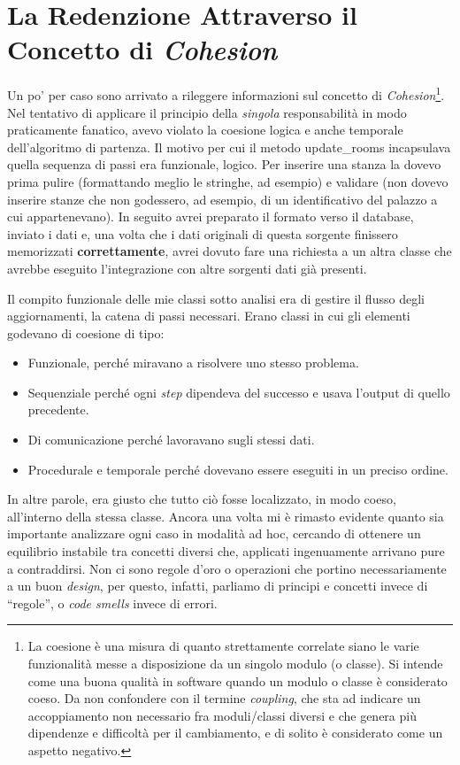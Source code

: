 \documentclass[12pt]{report}
\begin{document}
\section{La Redenzione Attraverso il Concetto di \textit{Cohesion}}
Un po' per caso sono arrivato a rileggere informazioni
sul concetto di \textit{Cohesion}\footnote{
La coesione è una misura di 
quanto strettamente correlate siano le varie funzionalità messe a disposizione 
da un singolo modulo (o classe). Si intende come una buona qualità in 
software quando un modulo o classe è considerato coeso. Da non confondere
con il termine \textit{coupling}, che sta ad indicare un accoppiamento non 
necessario fra moduli/classi diversi e che genera più dipendenze e difficoltà
per il cambiamento, e di solito è considerato come un aspetto negativo.
}.
Nel tentativo di applicare il principio della \textit{singola} responsabilità
in modo praticamente fanatico, avevo violato la coesione logica e anche
temporale dell'algoritmo di partenza. Il motivo per cui il metodo update\_rooms
incapsulava quella sequenza di passi era funzionale, logico. Per inserire 
una stanza la dovevo prima pulire (formattando meglio le stringhe, ad esempio)
e validare (non dovevo inserire stanze che non godessero, ad esempio, di un
identificativo del palazzo a cui appartenevano). In seguito avrei preparato il
formato verso il database, inviato i dati e, una volta che i dati originali
di questa sorgente finissero memorizzati \textbf{correttamente}, avrei dovuto 
fare una richiesta a un altra classe che avrebbe eseguito 
l'integrazione con altre sorgenti dati già presenti. 

Il compito funzionale delle mie classi sotto analisi era di gestire il 
flusso degli aggiornamenti, la catena di passi necessari.
Erano classi in cui gli elementi godevano di coesione di tipo:

\begin{itemize}
  \item Funzionale, perché miravano a risolvere uno stesso problema.
  \item Sequenziale perché ogni \textit{step} dipendeva del successo e usava 
  l'output di quello precedente.
  \item Di comunicazione perché lavoravano sugli stessi dati.
  \item Procedurale e temporale perché dovevano essere eseguiti in un preciso
ordine.
\end{itemize}

In altre parole, era giusto che tutto ciò fosse localizzato, in modo coeso, 
all'interno della stessa classe. Ancora una volta mi è rimasto evidente
quanto sia importante analizzare ogni caso
in modalità ad hoc, cercando di ottenere un equilibrio instabile tra concetti
diversi che, applicati ingenuamente arrivano pure a contraddirsi.
Non ci sono regole d'oro o operazioni che portino necessariamente
a un buon \textit{design}, per questo, infatti, parliamo di principi
e concetti invece di ``regole'', o \textit{code smells} invece di errori.
\end{document}
